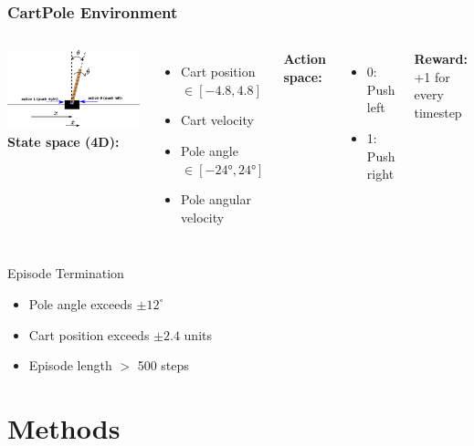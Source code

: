 \documentclass[
    9pt,
    aspectratio=169,
]{beamer}
\begin{document}
\begin{frame}
\frametitle{CartPole Environment}
\begin{columns}
\includegraphics[width=\textwidth]{media/cartpole_diagram.png}
\textbf{State space (4D):}
\begin{itemize}
    \item Cart position $\in [-4.8, 4.8]$
    \item Cart velocity 
    \item Pole angle $\in [-24°, 24°]$
    \item Pole angular velocity
\end{itemize}

\textbf{Action space:}
\begin{itemize}
    \item 0: Push left
    \item 1: Push right
\end{itemize}

\textbf{Reward:} +1 for every timestep
\end{columns}

\begin{block}{Episode Termination}
    \begin{itemize}
        \item Pole angle exceeds $\pm 12^{\circ}$
        \item Cart position exceeds $\pm 2.4$ units
        \item Episode length $>$ 500 steps
    \end{itemize}
\end{block}
\end{frame}

\section{Methods}
\end{document}
